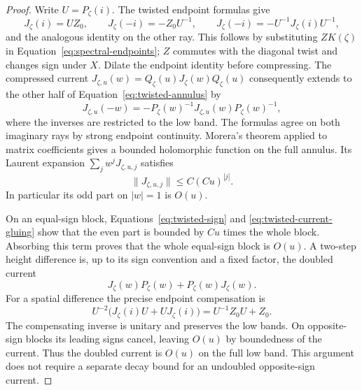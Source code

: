 \begin{proof}
Write $U=P_\zeta(i)$.  The twisted endpoint formulas give
\[
 J_\zeta(i)=UZ_0,\qquad J_\zeta(-i)=-Z_0U^{-1},\qquad
 J_\zeta(-i)=-U^{-1}J_\zeta(i)U^{-1},
\]
and the analogous identity on the other ray.  This follows by
substituting $ZK(\zeta)$ in
Equation~\eqref{eq:spectral-endpoints}; $Z$ commutes with the
diagonal twist and changes sign under $X$.  Dilate the endpoint
identity before compressing.  The compressed current
$J_{\zeta,u}(w)=Q_\zeta(u)J_\zeta(w)Q_\zeta(u)$ consequently
extends to the other half of Equation~\eqref{eq:twisted-annulus} by
\begin{equation}\label{eq:twisted-current-gluing}
 J_{\zeta,u}(-w)
 =-P_\zeta(w)^{-1}J_{\zeta,u}(w)P_\zeta(w)^{-1},
\end{equation}
where the inverses are restricted to the low band.  The formulas
agree on both imaginary rays by strong endpoint continuity.
Morera's theorem applied to matrix coefficients gives a bounded
holomorphic function on the full annulus.  Its Laurent expansion
$\sum_j w^jJ_{\zeta,u,j}$ satisfies
\[
 \|J_{\zeta,u,j}\|\le C(Cu)^{|j|}.
\]
In particular its odd part on $|w|=1$ is $O(u)$.

On an equal-sign block,
Equations~\eqref{eq:twisted-sign} and
\eqref{eq:twisted-current-gluing} show that the even part is bounded
by $Cu$ times the whole block.  Absorbing this term proves that the
whole equal-sign block is $O(u)$.  A two-step height difference is,
up to its sign convention and a fixed factor, the doubled current
\[
 J_\zeta(w)P_\zeta(w)+P_\zeta(w)J_\zeta(w).
\]
For a spatial difference the precise endpoint compensation is
\[
 U^{-2}\bigl(J_\zeta(i)U+UJ_\zeta(i)\bigr)
 =U^{-1}Z_0U+Z_0.
\]
The compensating inverse is unitary and preserves the low bands.
On opposite-sign blocks its leading signs cancel, leaving $O(u)$
by boundedness of the current.  Thus the doubled current is $O(u)$
on the full low band.  This argument does not require a separate
decay bound for an undoubled opposite-sign current.


\end{proof}
